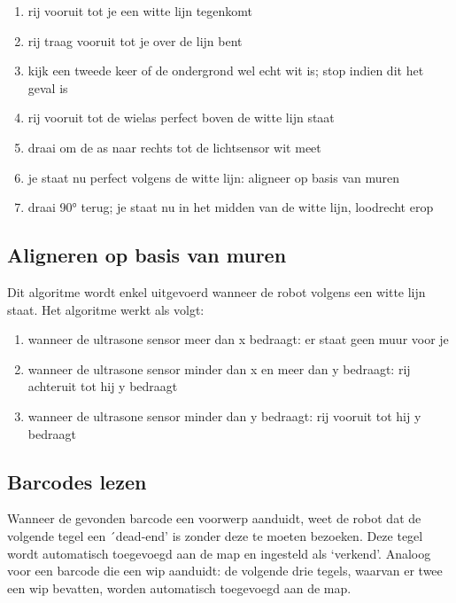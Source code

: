 \documentclass[tt3]{penoverslag}
\begin{document}
\begin{enumerate}
	\item rij vooruit tot je een witte lijn tegenkomt
	\item rij traag vooruit tot je over de lijn bent
	\item kijk een tweede keer of de ondergrond wel echt wit is; stop indien dit het geval is
	\item rij vooruit tot de wielas perfect boven de witte lijn staat
	\item draai om de as naar rechts tot de lichtsensor wit meet
	\item je staat nu perfect volgens de witte lijn: aligneer op basis van muren
	\item draai 90° terug; je staat nu in het midden van de witte lijn, loodrecht erop
\end{enumerate}

\subsection{Aligneren op basis van muren}
\label{ssec:AlgoAllignMuur}
Dit algoritme wordt enkel uitgevoerd wanneer de robot volgens een witte lijn staat. Het algoritme werkt als volgt:

\begin{enumerate}
	\item wanneer de ultrasone sensor meer dan x bedraagt: er staat geen muur voor je %
	\item wanneer de ultrasone sensor minder dan x en meer dan y bedraagt: rij achteruit tot hij y bedraagt %
	\item wanneer de ultrasone sensor minder dan y bedraagt: rij vooruit tot hij y bedraagt
\end{enumerate}



\subsection{Barcodes lezen}
\label{ssec:AlgoBar}

Wanneer de gevonden barcode een voorwerp aanduidt, weet de robot dat de volgende tegel een ´dead-end' is zonder deze te moeten bezoeken. Deze tegel wordt automatisch toegevoegd aan de map en ingesteld als `verkend'.
Analoog voor een barcode die een wip aanduidt: de volgende drie tegels, waarvan er twee een wip bevatten, worden automatisch toegevoegd aan de map.
\end{document}
